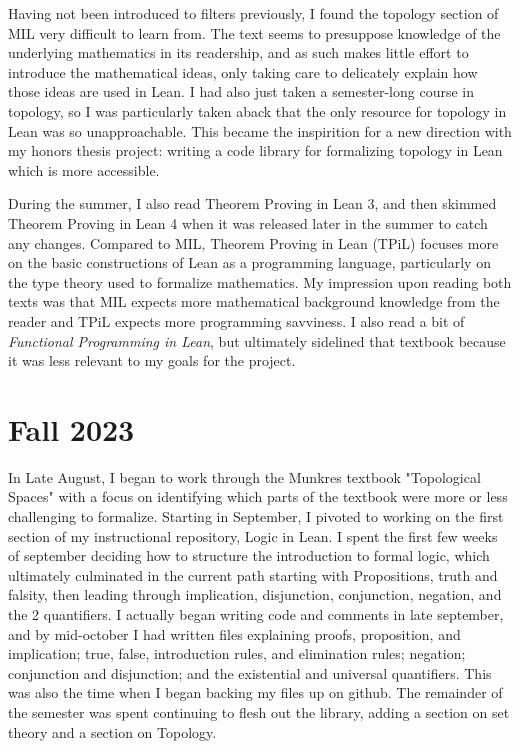 Having not been introduced to filters previously, I found the
topology section of MIL very difficult to learn from. The text seems 
to presuppose knowledge of the underlying mathematics in its readership,
and as such makes little effort to introduce the mathematical ideas, 
only taking care to delicately explain how those ideas are used in Lean.
I had also just taken a semester-long course in topology, so I was particularly 
taken aback that the only resource for topology in Lean was so unapproachable.
This became the inspirition for a new direction with my honors thesis project:
writing a code library for formalizing topology in Lean which is more accessible.

During the summer, I also read Theorem Proving in Lean 3, and then
skimmed Theorem Proving in Lean 4 when it was released later in the 
summer to catch any changes. Compared to MIL, Theorem Proving in Lean (TPiL) focuses
more on the basic constructions of Lean as a programming language, particularly
on the type theory used to formalize mathematics. My impression upon reading both
texts was that MIL expects more mathematical background knowledge from the reader
and TPiL expects more programming savviness. I also read a bit of 
\textit{Functional Programming in Lean}, but ultimately sidelined that
textbook because it was less relevant to my goals for the project. 

\section{Fall 2023}

In Late August, I began to work through the Munkres textbook
"Topological Spaces" with a focus on identifying which parts
of the textbook were more or less challenging to formalize. 
Starting in September, I pivoted to working on the first section
of my instructional repository, Logic in Lean. I spent the first few 
weeks of september deciding how to structure the introduction to 
formal logic, which ultimately culminated in the current path
starting with Propositions, truth and falsity, then leading through
implication, disjunction, conjunction, negation, and the 2 quantifiers.
I actually began writing code and comments in late september, and by
mid-october I had written files explaining proofs, proposition, and
implication; true, false, introduction rules, and elimination rules;
negation; conjunction and disjunction; and the existential and 
universal quantifiers. This was also the time when I began backing 
my files up on github. The remainder of the semester was spent 
continuing to flesh out the library, adding a section on set theory
and a section on Topology.

